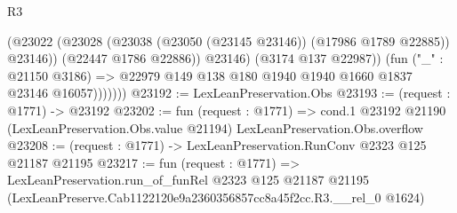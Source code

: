 \begin{lexlean}{R3}
\begin{coremodule}
                      (@23022
                        (@23028 (@23038 (@23050 (@23145 @23146)) (@17986 @1789 @22885)) @23146))
                      (@22447 @1786 @22886))
                    @23146)
                  (@3174 @137 @22987))
                (fun ("_" : @21150 @3186) =>
                @22979 @149 @138 @180 @1940 @1940 @1660 @1837 @23146 @16057)))))))
@23192 := LexLeanPreservation.Obs
@23193 := (request : @1771) -> @23192
@23202 := fun (request : @1771) =>
  cond.{1} @23192 @21190 (LexLeanPreservation.Obs.value @21194) LexLeanPreservation.Obs.overflow
@23208 := (request : @1771) -> LexLeanPreservation.RunConv @2323 @125 @21187 @21195
@23217 := fun (request : @1771) =>
  LexLeanPreservation.run_of_funRel
    @2323
    @125
    @21187
    @21195
    (LexLeanPreserve.Cab1122120e9a2360356857cc8a45f2cc.R3.__rel_0 @1624)
\end{coremodule}
\end{lexlean}
